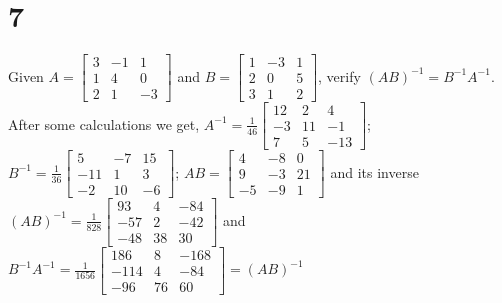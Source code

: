 \documentclass{article}
\begin{document}
\section*{7}
\begin{myleftlinebox}
    Given \(A = \begin{bmatrix}
        3 & -1 & 1\\
        1 & 4 & 0\\
        2 & 1 & -3
    \end{bmatrix}\) and \(B = \begin{bmatrix}
        1 & -3 & 1\\
        2 & 0 & 5\\
        3 & 1 & 2
    \end{bmatrix}\), verify \((AB)^{-1} = B^{-1}A^{-1}\).
    \tcblower
    After some calculations we get, \(A^{-1} = \frac{1}{46}\begin{bmatrix}
        12 & 2 & 4\\
        -3 & 11 & -1\\
        7 & 5 & -13
    \end{bmatrix}\); \(B^{-1} = \frac{1}{36}\begin{bmatrix}
        5 & -7 & 15\\
        -11 & 1 & 3\\
        -2 & 10 & -6
    \end{bmatrix}\); \(AB = \begin{bmatrix}
        4 & -8 & 0\\
        9 & -3 & 21\\
        -5 & -9 & 1
    \end{bmatrix}\) and its inverse \((AB)^{-1} = \frac{1}{828}\begin{bmatrix}
        93 & 4 & -84\\
        -57 & 2 & -42\\
        -48 & 38 & 30
    \end{bmatrix}\) and \( B^{-1}A^{-1} = \frac{1}{1656}\begin{bmatrix}
        186 & 8 & -168\\
        -114 & 4 & -84\\
        -96 & 76& 60
    \end{bmatrix} = (AB)^{-1} \)
\end{myleftlinebox}




%
%

\end{document}
